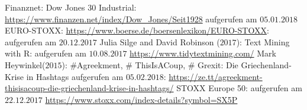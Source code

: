 
	\newpage
	\begin{thebibliography}{12345678}	
	 Finanznet: Dow Jones 30 Industrial: \url{https://www.finanzen.net/index/Dow_Jones/Seit1928} aufgerufen am $05.01.2018$	
	 EURO-STOXX: \url{https://www.boerse.de/boersenlexikon/EURO-STOXX}: aufgerufen am $20.12.2017$	
	Julia Silge and David Robinson ($2017$): Text Mining with R: aufgerufen am $10.08.2017$ \url{https://www.tidytextmining.com/}
	 Mark Heywinkel($2015$): \#Agreekment, \# ThisIsACoup, \# Grexit: Die Griechenland-Krise in Hashtags
	aufgerufen am $05.02.2018$:  \url{https://ze.tt/agreekment-thisisacoup-die-griechenland-krise-in-hashtags/}
	 STOXX Europe 50: aufgerufen am $22.12.2017$ \url{https://www.stoxx.com/index-details?symbol=SX5P}
\end{thebibliography}
\clearpage